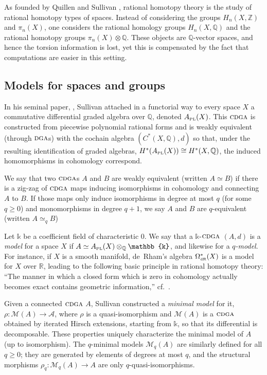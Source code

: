 \documentclass{article}
\numberwithin{equation}{section}
\theoremstyle{definition}
\newcommand{\Z}{\mathbb{Z}}
\newcommand{\Q}{\mathbb{Q}}
\newcommand{\R}{\mathbb{R}}
\renewcommand{\k}{\mathbb{k}}
\newcommand{\A}{{\mathcal{A}}}
\newcommand{\M}{\mathcal{M}}
\newcommand{\dga}{\ensuremath{\textsc{dga}}}
\newcommand{\cdga}{\ensuremath{\textsc{cdga}}}
\newcommand{\dR}{\scriptscriptstyle{\rm dR}}
\newcommand{\apl}{A_{\scriptscriptstyle{{\rm PL}}}}
\begin{document}
As founded by Quillen \cite{Qu69} and Sullivan \cite{Sullivan77}, 
rational homotopy theory is the study of rational homotopy types 
of spaces. Instead of considering the groups $H_n(X,\Z)$ and 
$\pi_n(X)$, one considers the rational homology groups $H_n(X,\Q)$ 
and the rational homotopy groups $\pi_n(X)\otimes \Q$. 
These objects are $\Q$-vector spaces, and hence the 
torsion information is lost, yet this is compensated by 
the fact that computations are easier in this setting.

\subsection{Models for spaces and groups}
\label{subsec:intro-models}
In his seminal paper, \cite{Sullivan77}, Sullivan attached in a functorial way to 
every space $X$ a commutative differential graded algebra over $\Q$, 
denoted $\apl(X)$. This $\cdga$ is constructed from piecewise polynomial rational 
forms and is weakly equivalent (through $\dga$s) with the cochain 
algebra $(C^*(X,\Q),d)$ so that, under the resulting identification 
of graded algebras, $H^{*}(\apl(X)) \cong H^{*}(X,\Q)$, the induced 
homomorphisms in cohomology correspond. 

We say that two $\cdga$s $A$ and $B$ are weakly equivalent 
(written $A\simeq B$) if there is a zig-zag of $\cdga$ maps 
inducing isomorphisms in cohomology and connecting $A$ to $B$. 
If those maps only induce isomorphisms in degree at most 
$q$ (for some $q\ge 0$) and monomorphisms in degree $q+1$, we say 
$A$ and $B$ are $q$-equivalent (written $A\simeq_q B$) 

Let $\k$ be a coefficient field of characteristic $0$. 
We say that a $\k$-$\cdga$ $(A,d)$ is a {\em model}\/ for a 
space $X$ if $A\simeq \apl(X)\otimes_{\Q} \k$, and likewise 
for a {\em $q$-model}. 
For instance, if $X$ is a smooth manifold, de~Rham's algebra 
$\Omega^*_{\dR}(X)$ is a model for $X$ over $\R$, 
leading to the following basic principle in rational homotopy theory:
``The manner in which a closed form which is zero in 
cohomology actually becomes exact contains geometric 
information,'' cf.~\cite{DGMS}. 

Given a connected $\cdga$ $A$, Sullivan constructed a {\em minimal model}\/ 
for it, $\rho\colon \M(A)\to \A$, where $\rho$ is a quasi-isomorphism 
and $\M(A)$ is a $\cdga$ obtained by iterated Hirsch extensions, 
starting from $\k$, so that its differential is decomposable. These 
properties uniquely characterize the minimal model of $A$ (up to 
isomorphism). The $q$-minimal models $\M_q(A)$ are similarly 
defined for all $q\ge 0$; they are generated by elements of degrees 
at most $q$, and the structural morphisms $\rho_q\colon \M_q(A)\to A$ 
are only $q$-quasi-isomorphisms. 
\end{document}
